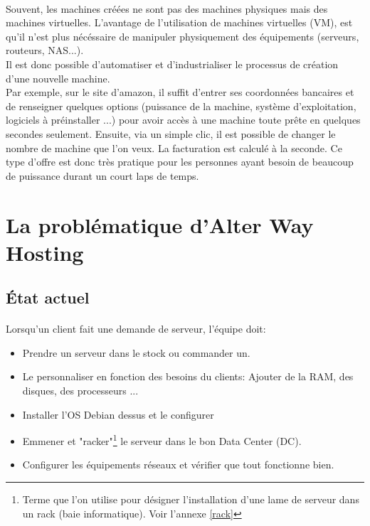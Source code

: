 \paragraph*{}
Souvent, les machines créées ne sont pas des machines physiques mais des machines virtuelles. L'avantage de l'utilisation de machines virtuelles (VM), est
qu'il n'est plus nécéssaire de manipuler physiquement des équipements (serveurs, routeurs, NAS...).
\\
Il est donc possible d'automatiser et d'industrialiser le processus de création d'une nouvelle machine.
\\
Par exemple, sur le site d'amazon, il suffit d'entrer ses coordonnées bancaires et de renseigner quelques options (puissance de la machine, système d'exploitation, logiciels à préinstaller ...)
 pour avoir accès à une machine toute prête en quelques secondes seulement. Ensuite, via un simple clic, il est possible de changer le nombre de machine que l'on veux.
La facturation est calculé à la seconde. Ce type d'offre est donc très pratique pour les personnes ayant besoin de beaucoup de puissance durant un court laps de temps.

\section{La problématique d'Alter Way Hosting}

\subsection{État actuel}
\paragraph*{}
Lorsqu'un client fait une demande de serveur, l'équipe doit:
\begin{itemize}
	\item Prendre un serveur dans le stock ou commander un.
	\item Le personnaliser en fonction des besoins du clients: Ajouter de la RAM, des disques, des processeurs ...
	\item Installer l'OS Debian dessus et le configurer
	\item Emmener et "racker"\footnote{Terme que l'on utilise pour désigner l'installation d'une lame de serveur dans un rack (baie informatique). Voir l'annexe \ref{rack}} le serveur
	dans le bon Data Center (DC).
	\item Configurer les équipements réseaux et vérifier que tout fonctionne bien.
\end{itemize}

